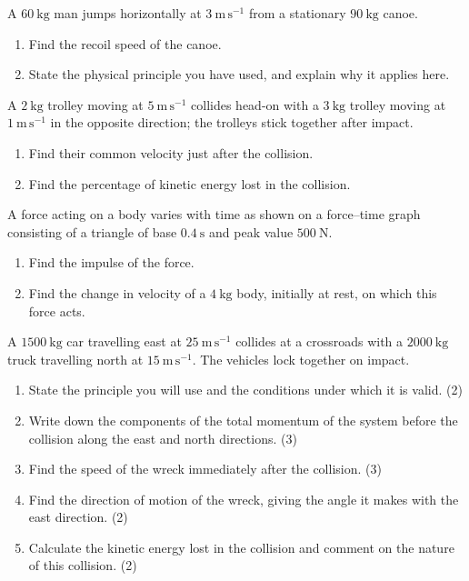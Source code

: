 \documentclass[11pt]{article}
\newcounter{popsec}
\newcounter{popsub}
\newcommand{\courssub}[1]{%
  \stepcounter{popsub}%
  \par\vspace{9pt}\noindent{\popxbold\fontsize{11.5}{13}\selectfont\color{popink}{\color{poporange}\thepopsec.\thepopsub}\hspace{6pt}#1}\par\nopagebreak\vspace{4pt}
}
\begin{document}
\begin{exercice}
A $60\ \mathrm{kg}$ man jumps horizontally at $3\ \mathrm{m\,s^{-1}}$ from a stationary $90\ \mathrm{kg}$ canoe.
\begin{enumerate}
\item Find the recoil speed of the canoe.
\item State the physical principle you have used, and explain why it applies here.
\end{enumerate}
\end{exercice}

\begin{exercice}
A $2\ \mathrm{kg}$ trolley moving at $5\ \mathrm{m\,s^{-1}}$ collides head-on with a $3\ \mathrm{kg}$ trolley moving at $1\ \mathrm{m\,s^{-1}}$ in the opposite direction; the trolleys stick together after impact.
\begin{enumerate}
\item Find their common velocity just after the collision.
\item Find the percentage of kinetic energy lost in the collision.
\end{enumerate}
\end{exercice}

\begin{exercice}
A force acting on a body varies with time as shown on a force--time graph consisting of a triangle of base $0.4\ \mathrm{s}$ and peak value $500\ \mathrm{N}$.
\begin{enumerate}
\item Find the impulse of the force.
\item Find the change in velocity of a $4\ \mathrm{kg}$ body, initially at rest, on which this force acts.
\end{enumerate}
\end{exercice}

\courssub{I prepare for the GCE}

\begin{exercice}
A $1500\ \mathrm{kg}$ car travelling east at $25\ \mathrm{m\,s^{-1}}$ collides at a crossroads with a $2000\ \mathrm{kg}$ truck travelling north at $15\ \mathrm{m\,s^{-1}}$. The vehicles lock together on impact.
\begin{enumerate}
\item State the principle you will use and the conditions under which it is valid. \hfill (2)
\item Write down the components of the total momentum of the system before the collision along the east and north directions. \hfill (3)
\item Find the speed of the wreck immediately after the collision. \hfill (3)
\item Find the direction of motion of the wreck, giving the angle it makes with the east direction. \hfill (2)
\item Calculate the kinetic energy lost in the collision and comment on the nature of this collision. \hfill (2)
\end{enumerate}
\end{exercice}
\end{document}

